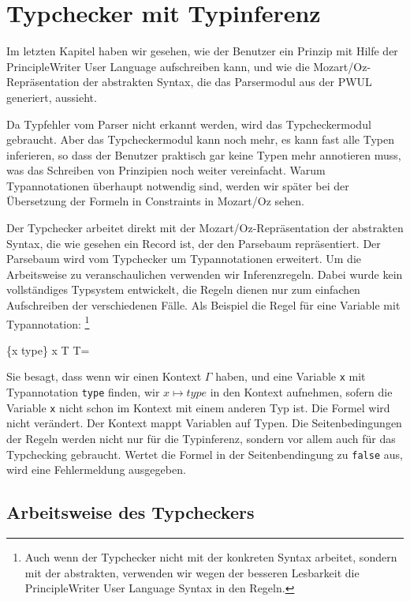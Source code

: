 \section{Typchecker mit Typinferenz}

Im letzten Kapitel haben wir gesehen, wie der Benutzer ein Prinzip mit
Hilfe der PrincipleWriter User Language aufschreiben kann, und wie die
Mozart/Oz-Repr\"asentation der abstrakten Syntax, die das Parsermodul
aus der PWUL generiert, aussieht.

Da Typfehler vom Parser nicht erkannt werden, wird das Typcheckermodul
gebraucht.  Aber das Typcheckermodul kann noch mehr, es kann fast alle
Typen inferieren, so dass der Benutzer praktisch gar keine Typen mehr
annotieren muss, was das Schreiben von Prinzipien noch weiter
vereinfacht. Warum Typannotationen \"uberhaupt notwendig sind, werden
wir sp\"ater bei der \"Ubersetzung der Formeln in Constraints in
Mozart/Oz sehen.

Der Typchecker arbeitet direkt mit der Mozart/Oz-Repr\"asentation der
abstrakten Syntax, die wie gesehen ein Record ist, der den Parsebaum
repr\"asentiert. Der Parsebaum wird vom Typchecker um Typannotationen
erweitert. Um die Arbeitsweise zu veranschaulichen verwenden wir
Inferenzregeln. Dabei wurde kein vollst\"andiges Typsystem entwickelt,
die Regeln dienen nur zum einfachen Aufschreiben der verschiedenen
F\"alle. Als Beispiel die Regel f\"ur eine Variable mit Typannotation:
\footnote{Auch wenn der Typchecker nicht mit der konkreten Syntax
  arbeitet, sondern mit der abstrakten, verwenden wir wegen der
  besseren Lesbarkeit die PrincipleWriter User Language Syntax in den
  Regeln.}

      {\Gamma \cup \{x \mapsto type\} \vdash {}}
      {x \mapsto T \in \Gamma \Rightarrow T=}
     
Sie besagt, dass wenn wir einen Kontext $\Gamma$ haben, und eine Variable
{\tt x} mit Typannotation {\tt type} finden, wir $x \mapsto \mathit{type}$
in den Kontext aufnehmen, sofern die Variable {\tt x} nicht schon im
Kontext mit einem anderen Typ ist. Die Formel wird nicht ver\"andert.
Der Kontext mappt Variablen auf Typen. Die Seitenbedingungen der
Regeln werden nicht nur f\"ur die Typinferenz, sondern vor allem auch
f\"ur das Typchecking gebraucht. Wertet die Formel in der
Seitenbendingung zu {\tt false} aus, wird eine Fehlermeldung
ausgegeben.

\subsection{Arbeitsweise des Typcheckers}


